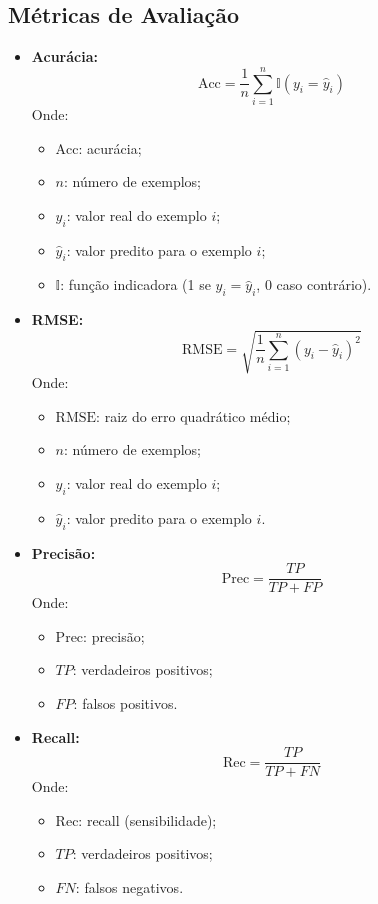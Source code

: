 \documentclass[11pt]{article}
\begin{document}
\subsection{Métricas de Avaliação}
\begin{itemize}
    \item \textbf{Acurácia:}
    \[
    \mathrm{Acc} = \frac{1}{n} \sum_{i=1}^n \mathbb{I}(y_i = \hat{y}_i)
    \]
    Onde:
    \begin{itemize}
        \item $\mathrm{Acc}$: acurácia;
        \item $n$: número de exemplos;
        \item $y_i$: valor real do exemplo $i$;
        \item $\hat{y}_i$: valor predito para o exemplo $i$;
        \item $\mathbb{I}$: função indicadora (1 se $y_i = \hat{y}_i$, 0 caso contrário).
    \end{itemize}
    \item \textbf{RMSE:}
    \[
    \mathrm{RMSE} = \sqrt{\frac{1}{n} \sum_{i=1}^n (y_i - \hat{y}_i)^2}
    \]
    Onde:
    \begin{itemize}
        \item $\mathrm{RMSE}$: raiz do erro quadrático médio;
        \item $n$: número de exemplos;
        \item $y_i$: valor real do exemplo $i$;
        \item $\hat{y}_i$: valor predito para o exemplo $i$.
    \end{itemize}
    \item \textbf{Precisão:}
    \[
    \mathrm{Prec} = \frac{TP}{TP + FP}
    \]
    Onde:
    \begin{itemize}
        \item $\mathrm{Prec}$: precisão;
        \item $TP$: verdadeiros positivos;
        \item $FP$: falsos positivos.
    \end{itemize}
    \item \textbf{Recall:}
    \[
    \mathrm{Rec} = \frac{TP}{TP + FN}
    \]
    Onde:
    \begin{itemize}
        \item $\mathrm{Rec}$: recall (sensibilidade);
        \item $TP$: verdadeiros positivos;
        \item $FN$: falsos negativos.
    \end{itemize}

\end{itemize}
\end{document}
